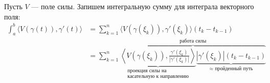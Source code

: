 Пусть $V$ --- поле силы. Запишем интегральную сумму для интеграла векторного поля:
\begin{align*}
	\int_a^b \langle V(\gamma(t)), \gamma'(t)\rangle & = \sum_{k=1}^{n} \langle V(\gamma(\xi_k)), \gamma'(\xi_k)\rangle(t_k-t_{k-1})                                                                                   \\
	                                                 & = \sum_{k=1}^{n} \overbrace{\underbrace{\left\langle V(\gamma(\xi_k)), \frac{\gamma'(\xi_k)}{|\gamma'(\xi_k)|}\right\rangle}_{\substack{\text{проекция силы на} \\ \text{касательную к направлению}}} \underbrace{|\gamma'(\xi_k)|(t_k-t_{k-1})}_{\approx\text{ пройденный путь}}}^{\text{работа силы}}
\end{align*}

